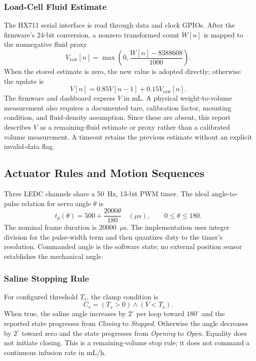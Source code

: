 \subsubsection{Load-Cell Fluid Estimate}
The HX711 serial interface is read through data and clock GPIOs. After the firmware's 24-bit conversion, a nonzero transformed count $W[n]$ is mapped to the nonnegative fluid proxy
\begin{equation}
V_{\mathrm{raw}}[n]=\max\!\left(0,\frac{W[n]-8388608}{1000}\right).
\end{equation}
When the stored estimate is zero, the new value is adopted directly; otherwise the update is
\begin{equation}
V[n]=0.85V[n-1]+0.15V_{\mathrm{raw}}[n].
\end{equation}
The firmware and dashboard express $V$ in mL. A physical weight-to-volume measurement also requires a documented tare, calibration factor, mounting condition, and fluid-density assumption. Since these are absent, this report describes $V$ as a remaining-fluid estimate or proxy rather than a calibrated volume measurement. A timeout retains the previous estimate without an explicit invalid-data flag.

\subsection{Actuator Rules and Motion Sequences}
Three LEDC channels share a 50~Hz, 13-bit PWM timer. The ideal angle-to-pulse relation for servo angle $\theta$ is
\begin{equation}
t_p(\theta)=500+\frac{2000\theta}{180}\quad (\mu\mathrm{s}),\qquad 0\leq\theta\leq180.
\end{equation}
The nominal frame duration is 20000~$\mu$s. The implementation uses integer division for the pulse-width term and then quantizes duty to the timer's resolution. Commanded angle is the software state; no external position sensor establishes the mechanical angle.

\subsubsection{Saline Stopping Rule}
For configured threshold $T_s$, the clamp condition is
\begin{equation}\label{eq:saline}
C_s=(T_s>0)\land(V<T_s).
\end{equation}
When true, the saline angle increases by $2^{\circ}$ per loop toward $180^{\circ}$ and the reported state progresses from \emph{Closing} to \emph{Stopped}. Otherwise the angle decreases by $2^{\circ}$ toward zero and the state progresses from \emph{Opening} to \emph{Open}. Equality does not initiate closing. This is a remaining-volume stop rule; it does not command a continuous infusion rate in mL/h.

